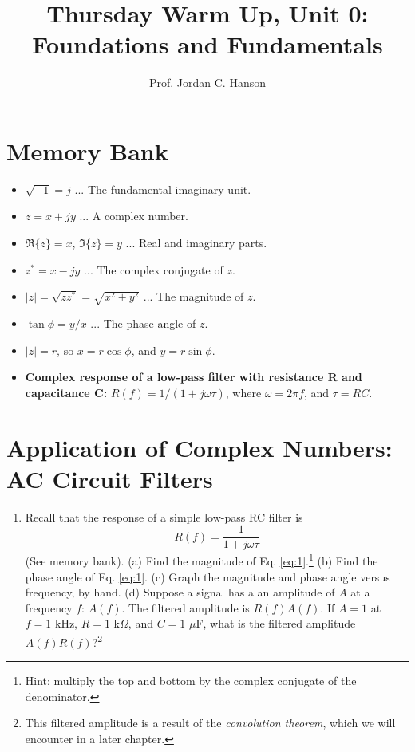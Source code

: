 \documentclass{article}
\begin{document}
\twocolumn

\title{Thursday Warm Up, Unit 0: Foundations and Fundamentals}
\author{Prof. Jordan C. Hanson}
\maketitle

\section{Memory Bank}

\begin{itemize}
\item $\sqrt{-1} = j$ ... The fundamental imaginary unit.
\item $z = x + jy$ ... A complex number.
\item $\Re \lbrace z \rbrace = x$, $\Im \lbrace z \rbrace = y$ ... Real and imaginary parts.
\item $z^{*} = x - j y$ ... The complex conjugate of $z$.
\item $|z| = \sqrt{z z^{*}} = \sqrt{x^2 + y^2}$ ... The magnitude of $z$.
\item $\tan\phi = y/x$ ... The phase angle of $z$.
\item $|z| = r$, so $x = r\cos\phi$, and $y = r\sin\phi$.
\item \textbf{Complex response of a low-pass filter with resistance R and capacitance C:} $R(f) = 1/(1+j\omega \tau)$, where $\omega = 2\pi f$, and $\tau = RC$.
\end{itemize}

\section{Application of Complex Numbers: AC Circuit Filters}

\begin{enumerate}
\item Recall that the response of a simple low-pass RC filter is
\begin{equation}
R(f) = \frac{1}{1+j\omega \tau} \label{eq:1}
\end{equation}
(See memory bank).  (a) Find the magnitude of Eq. \ref{eq:1}.\footnote{Hint: multiply the top and bottom by the complex conjugate of the denominator.}  (b) Find the phase angle of Eq. \ref{eq:1}. (c) Graph the magnitude and phase angle versus frequency, by hand.  (d) Suppose a signal has a an amplitude of $A$ at a frequency $f$: $A(f)$.  The filtered amplitude is $R(f) A(f)$.  If $A=1$ at $f = 1$ kHz, $R = 1$ k$\Omega$, and $C = 1$ $\mu$F, what is the filtered amplitude $A(f) R(f)$?\footnote{This filtered amplitude is a result of the \textit{convolution theorem}, which we will encounter in a later chapter.} \\ \vspace{4cm}
\end{enumerate}
\end{document}
